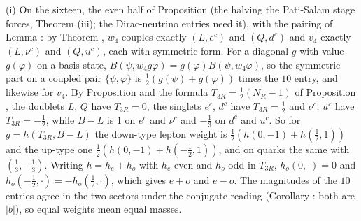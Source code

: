 (i) On the sixteen, the even half of Proposition  (the halving the Pati-Salam stage forces, Theorem (iii); the Dirac-neutrino entries need it), with the pairing of Lemma : by Theorem , $w_{4}$ couples exactly $(L, e^{c})$ and $(Q, d^{c})$ and $v_{4}$ exactly $(L, \nu^{c})$ and $(Q, u^{c})$, each with symmetric form. For a diagonal $g$ with value $g(\varphi)$ on a basis state, $B(\psi, w_{4}g\varphi) = g(\varphi)B(\psi, w_{4}\varphi)$, so the symmetric part on a coupled pair $\{\psi, \varphi\}$ is $\tfrac12(g(\psi) + g(\varphi))$ times the $10$ entry, and likewise for $v_{4}$. By Proposition  and the formula $T_{3R} = \tfrac12(N_{R} - 1)$ of Proposition , the doublets $L$, $Q$ have $T_{3R} = 0$, the singlets $e^{c}$, $d^{c}$ have $T_{3R} = \tfrac12$ and $\nu^{c}$, $u^{c}$ have $T_{3R} = -\tfrac12$, while $B - L$ is $1$ on $e^{c}$ and $\nu^{c}$ and $-\tfrac13$ on $d^{c}$ and $u^{c}$. So for $g = h(T_{3R}, B - L)$ the down-type lepton weight is $\tfrac12(h(0, -1) + h(\tfrac12, 1))$ and the up-type one $\tfrac12(h(0, -1) + h(-\tfrac12, 1))$, and on quarks the same with $(\tfrac13, -\tfrac13)$. Writing $h = h_{e} + h_{o}$ with $h_{e}$ even and $h_{o}$ odd in $T_{3R}$, $h_{o}(0, \cdot) = 0$ and $h_{o}(-\tfrac12, \cdot) = -h_{o}(\tfrac12, \cdot)$, which gives $e + o$ and $e - o$. The magnitudes of the $10$ entries agree in the two sectors under the conjugate reading (Corollary : both are $|b|$), so equal weights mean equal masses.

